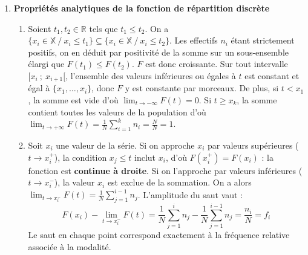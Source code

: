 \documentclass[11pt,a4paper]{article}
\begin{document}
\begin{enumerate}
\begin{enumerate}
        \item \textbf{Nullité du double produit :} Étudions le terme central :
        \[ \frac{2}{N}\sum_{g=1}^G \sum_{i \in \Omega_g} (x_i - \overline{x}_g)(\overline{x}_g - \overline{x}) \]
        Pour un groupe $g$ fixé, le facteur $(\overline{x}_g - \overline{x})$ ne dépend pas de $i$, on peut donc l'extraire de la somme interne :
        \[ \frac{2}{N}\sum_{g=1}^G (\overline{x}_g - \overline{x}) \left[ \sum_{i \in \Omega_g} (x_i - \overline{x}_g) \right] \]
        Or, par définition de la moyenne locale $\overline{x}_g = \frac{1}{N_g}\sum_{i \in \Omega_g} x_i$, on a $\sum_{i \in \Omega_g} x_i = N_g \overline{x}_g$. Par conséquent, la somme des écarts à la moyenne est nulle : $\sum_{i \in \Omega_g} (x_i - \overline{x}_g) = N_g \overline{x}_g - N_g \overline{x}_g = 0$. Le double produit est donc rigoureusement nul.
    \end{enumerate}

    \item \textbf{Propriétés analytiques de la fonction de répartition discrète}
    \begin{enumerate}
        \item Soient $t_1, t_2 \in \mathbb{R}$ tels que $t_1 \le t_2$. On a $\{x_i \in \mathbb{X} \ / \ x_i \le t_1\} \subseteq \{x_i \in \mathbb{X} \ / \ x_i \le t_2\}$. Les effectifs $n_i$ étant strictement positifs, on en déduit par positivité de la somme sur un sous-ensemble élargi que $F(t_1) \le F(t_2)$. $F$ est donc croissante.
        Sur tout intervalle $[x_i \ ; \ x_{i+1}[$, l'ensemble des valeurs inférieures ou égales à $t$ est constant et égal à $\{x_1, \dots, x_i\}$, donc $F$ y est constante par morceaux.
        De plus, si $t < x_1$, la somme est vide d'où $\lim_{t \to -\infty} F(t) = 0$. Si $t \ge x_k$, la somme contient toutes les valeurs de la population d'où $\lim_{t \to +\infty} F(t) = \frac{1}{N}\sum_{i=1}^k n_i = \frac{N}{N} = 1$.
        
        \item Soit $x_i$ une valeur de la série. Si on approche $x_i$ par valeurs supérieures ($t \to x_i^+$), la condition $x_j \le t$ inclut $x_i$, d'où $F(x_i^+) = F(x_i)$ : la fonction est \textbf{continue à droite}.
        Si on l'approche par valeurs inférieures ($t \to x_i^-$), la valeur $x_i$ est exclue de la sommation. On a alors $\lim_{t \to x_i^-} F(t) = \frac{1}{N}\sum_{j=1}^{i-1} n_j$.
        L'amplitude du saut vaut :
        \[ F(x_i) - \lim_{t \to x_i^-} F(t) = \frac{1}{N}\sum_{j=1}^{i} n_j - \frac{1}{N}\sum_{j=1}^{i-1} n_j = \frac{n_i}{N} = f_i \]
        Le saut en chaque point correspond exactement à la fréquence relative associée à la modalité.
    \end{enumerate}
\end{enumerate}
\end{document}
